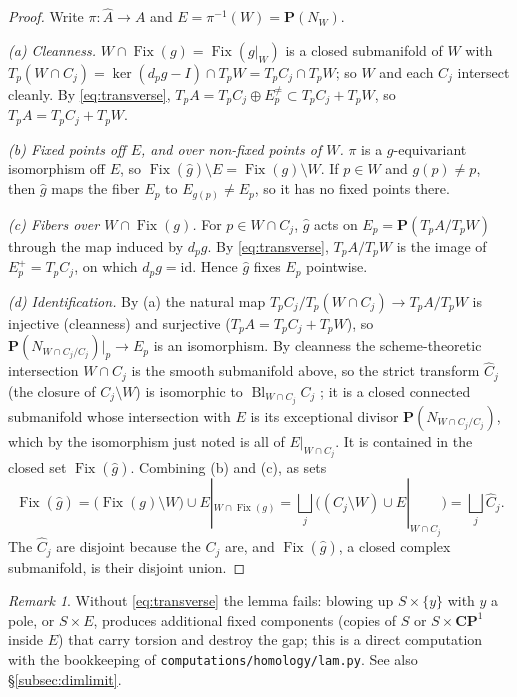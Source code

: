 \documentclass[11pt]{amsart}
\numberwithin{equation}{section}
\theoremstyle{definition}
\theoremstyle{remark}
\newtheorem{remark}[theorem]{Remark}
\newcommand{\CP}{\mathbf{CP}}
\newcommand{\PP}{\mathbf P}
\DeclareMathOperator{\Fix}{Fix}
\DeclareMathOperator{\Bl}{Bl}
\newcommand{\id}{\mathrm{id}}
\begin{document}
\begin{proof}
Write $\pi\colon\widehat A\to A$ and $E=\pi^{-1}(W)=\PP(N_W)$.

\emph{(a) Cleanness.} $W\cap\Fix(g)=\Fix(g|_W)$ is a closed submanifold
of $W$ with $T_p(W\cap C_j)=\ker(d_pg-I)\cap T_pW=T_pC_j\cap T_pW$; so $W$
and each $C_j$ intersect cleanly. By \eqref{eq:transverse},
$T_pA=T_pC_j\oplus E_p^{\ne}\subset T_pC_j+T_pW$, so
$T_pA=T_pC_j+T_pW$.

\emph{(b) Fixed points off $E$, and over non-fixed points of $W$.} $\pi$ is a
$g$-equivariant isomorphism off $E$, so $\Fix(\hat g)\setminus E=
\Fix(g)\setminus W$. If $p\in W$ and $g(p)\ne p$, then $\hat g$ maps the
fiber $E_p$ to $E_{g(p)}\ne E_p$, so it has no fixed points there.

\emph{(c) Fibers over $W\cap\Fix(g)$.} For $p\in W\cap C_j$, $\hat g$ acts on
$E_p=\PP(T_pA/T_pW)$ through the map induced by $d_pg$. By
\eqref{eq:transverse}, $T_pA/T_pW$ is the image of $E_p^+=T_pC_j$, on
which $d_pg=\id$. Hence $\hat g$ fixes $E_p$ pointwise.

\emph{(d) Identification.} By (a) the natural map
$T_pC_j/T_p(W\cap C_j)\to T_pA/T_pW$ is injective (cleanness) and surjective
($T_pA=T_pC_j+T_pW$), so $\PP(N_{W\cap C_j/C_j})|_p\to E_p$ is an
isomorphism. By cleanness the scheme-theoretic intersection $W\cap C_j$ is
the smooth submanifold above, so the strict transform $\widehat C_j$
(the closure of $C_j\setminus W$) is isomorphic to $\Bl_{W\cap C_j}C_j$
\cite[II.7.15]{Hartshorne1977}; it is a closed connected submanifold whose
intersection with $E$ is its exceptional divisor
$\PP(N_{W\cap C_j/C_j})$, which by the isomorphism just noted is all of
$E|_{W\cap C_j}$. It is contained in the closed set $\Fix(\hat g)$.
Combining (b) and (c), as sets
\[
  \Fix(\hat g)=\bigl(\Fix(g)\setminus W\bigr)\cup E|_{W\cap\Fix(g)}
  =\bigsqcup_j\bigl((C_j\setminus W)\cup E|_{W\cap C_j}\bigr)
  =\bigsqcup_j\widehat C_j .
\]
The $\widehat C_j$ are disjoint because the $C_j$ are, and $\Fix(\hat g)$,
a closed complex submanifold, is their disjoint union.
\end{proof}

\begin{remark}
Without \eqref{eq:transverse} the lemma fails: blowing up $S\times\{y\}$
with $y$ a pole, or $S\times E$, produces additional fixed components
(copies of $S$ or $S\times\CP^1$ inside $E$) that carry torsion and destroy
the gap; this is a direct computation with the bookkeeping of
\nolinkurl{computations/homology/lam.py}. See also
\S\ref{subsec:dimlimit}.
\end{remark}
\end{document}
